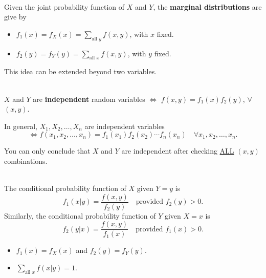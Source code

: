 \begin{definition}
    \phantom{}\\
    Given the joint probability function of $X$ and $Y$, the \textbf{marginal distributions} are give by
    \begin{itemize}
        \item $f_1(x) = f_X(x) = \displaystyle \sum_{\text{all } y} f(x,y)$, with $x$ fixed.
        \item  $f_2(y) = f_Y(y) = \displaystyle \sum_{\text{all } x} f(x,y)$, with $y$ fixed.
    \end{itemize}
\end{definition}

\begin{remark}
    This idea can be extended beyond two variables.
\end{remark}

\begin{definition}
    \phantom{}\\
    $X$ and $Y$ are \textbf{independent} random variables $\iff$ $f(x, y) = f_1(x)f_2(y)$,
    $\forall$ $(x, y)$.
\end{definition}

In general, $X_1, X_2, \ldots, X_n$ are independent variables \vspace{-3mm}
    \[\iff f(x_1, x_2, \ldots, x_n) = f_1(x_1)f_2(x_2) \cdots f_n(x_n) \quad \forall x_1, x_2, \ldots, x_n.\]

\begin{remark}
    You can only conclude that $X$ and $Y$ are independent after checking \underline{ALL} $(x,y)$ combinations.
\end{remark}

\pagebreak

\begin{definition}
    \phantom{}  \\
    The conditional probability function of $X$ given $Y = y$ is
    \[f_1(x|y) = \frac{f(x, y)}{f_2(y)} \quad \text{provided $f_2(y) > 0$}.\]
    Similarly, the conditional probability function of $Y$ given $X = x$ is
    \[f_2(y|x) = \frac{f(x, y)}{f_1(x)} \quad \text{provided $f_1(x) > 0$}.\]
\end{definition}

\begin{note}
    \phantom{}
    \begin{itemize}
        \item $f_1(x) = f_X(x)$ and $f_2(y) = f_Y(y)$.
        \item $\displaystyle \sum_{\text{all } x} f(x|y) = 1$.
    \end{itemize}
\end{note}

